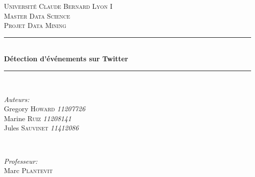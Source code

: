 \documentclass[12pt]{article}
\begin{document}
\begin{titlepage}

\newcommand{\HRule}{\rule{\linewidth}{0.5mm}} %

\center %
 

\textsc{\LARGE Universit\'e Claude Bernard Lyon I}\\[1.5cm] %
\textsc{\Large Master Data Science}\\[0.5cm] %
\textsc{\large Projet Data Mining}\\[0.5cm] %


\HRule \\[0.4cm]
{ \huge \bfseries D\'etection d'\'ev\'enements sur Twitter}\\[0.4cm] %
\HRule \\[1.5cm]
 

\begin{minipage}{0.4\textwidth}
\begin{flushleft} \large
\emph{Auteurs:}\\
Gregory \textsc{Howard} \textit{11207726} \\ 
Marine \textsc{Ruiz} \textit{11208141} \\ 
Jules \textsc{Sauvinet} \textit{11412086}
\end{flushleft}
\end{minipage}
~
\begin{minipage}{0.4\textwidth}
\begin{flushright} \large
\emph{Professeur:} \\
Marc \textsc{Plantevit} %
\end{flushright}
\end{minipage}\\[2cm]


\end{titlepage}
\end{document}
